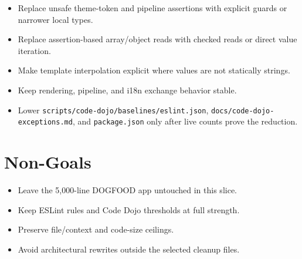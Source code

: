 \begin{itemize}
\tightlist
\item
  Replace unsafe theme-token and pipeline assertions with explicit guards or narrower local types.
\item
  Replace assertion-based array/object reads with checked reads or direct value iteration.
\item
  Make template interpolation explicit where values are not statically strings.
\item
  Keep rendering, pipeline, and i18n exchange behavior stable.
\item
  Lower \texttt{s\allowbreak{}c\allowbreak{}r\allowbreak{}i\allowbreak{}p\allowbreak{}t\allowbreak{}s\allowbreak{}/\allowbreak{}c\allowbreak{}o\allowbreak{}d\allowbreak{}e\allowbreak{}-\allowbreak{}d\allowbreak{}o\allowbreak{}j\allowbreak{}o\allowbreak{}/\allowbreak{}b\allowbreak{}a\allowbreak{}s\allowbreak{}e\allowbreak{}l\allowbreak{}i\allowbreak{}n\allowbreak{}e\allowbreak{}s\allowbreak{}/\allowbreak{}e\allowbreak{}s\allowbreak{}l\allowbreak{}i\allowbreak{}n\allowbreak{}t\allowbreak{}.\allowbreak{}j\allowbreak{}s\allowbreak{}o\allowbreak{}n}, \texttt{d\allowbreak{}o\allowbreak{}c\allowbreak{}s\allowbreak{}/\allowbreak{}c\allowbreak{}o\allowbreak{}d\allowbreak{}e\allowbreak{}-\allowbreak{}d\allowbreak{}o\allowbreak{}j\allowbreak{}o\allowbreak{}-\allowbreak{}e\allowbreak{}x\allowbreak{}c\allowbreak{}e\allowbreak{}p\allowbreak{}t\allowbreak{}i\allowbreak{}o\allowbreak{}n\allowbreak{}s\allowbreak{}.\allowbreak{}m\allowbreak{}d}, and \texttt{p\allowbreak{}a\allowbreak{}c\allowbreak{}k\allowbreak{}a\allowbreak{}g\allowbreak{}e\allowbreak{}.\allowbreak{}j\allowbreak{}s\allowbreak{}o\allowbreak{}n} only after live counts prove the reduction.
\end{itemize}

\section{Non-Goals}\label{record-219-non-goals}

\begin{itemize}
\tightlist
\item
  Leave the 5,000-line DOGFOOD app untouched in this slice.
\item
  Keep ESLint rules and Code Dojo thresholds at full strength.
\item
  Preserve file/context and code-size ceilings.
\item
  Avoid architectural rewrites outside the selected cleanup files.
\end{itemize}

